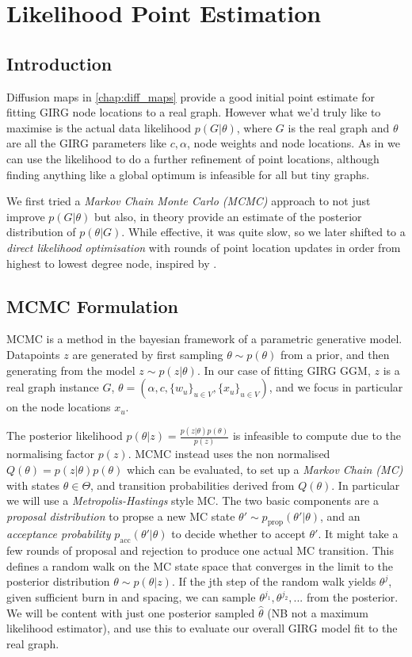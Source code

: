 \chapter{Likelihood Point Estimation}
\label{chap:likelihood_point_estimation}
\minitoc
\section{Introduction}
Diffusion maps in \cref{chap:diff_maps} provide a good initial point estimate for fitting GIRG node locations to a real graph. However what we'd truly like to maximise is the actual data likelihood $p(G | \theta)$, where $G$ is the real graph and $\theta$ are all the GIRG parameters like $c, \alpha$, node weights and node locations. As in \cite{garcia2019mercator} we can use the likelihood to do a further refinement of point locations, although finding anything like a global optimum is infeasible for all but tiny graphs.

We first tried a \textit{Markov Chain Monte Carlo (MCMC)} approach to not just improve $p(G | \theta)$ but also, in theory provide an estimate of the posterior distribution of $p(\theta | G)$. While effective, it was quite slow, so we later shifted to a \textit{direct likelihood optimisation} with rounds of point location updates in order from highest to lowest degree node, inspired by \cite{garcia2019mercator}.

\section{MCMC Formulation}
MCMC is a method in the bayesian framework of a parametric generative model. Datapoints $z$ are generated by first sampling $\theta \sim p(\theta)$ from a prior, and then generating from the model $z \sim p(z | \theta)$. In our case of fitting GIRG GGM, $z$ is a real graph instance $G$, $\theta = (\alpha, c, \{w_u\}_{u \in V}, \{x_u\}_{u \in V})$, and we focus in particular on the node locations $x_u$.

The posterior likelihood $p(\theta | z) = \frac{p(z | \theta) p(\theta)}{p(z)}$ is infeasible to compute due to the normalising factor $p(z)$. MCMC instead uses the non normalised $Q(\theta) = p(z | \theta) p(\theta)$ which can be evaluated, to set up a \textit{Markov Chain (MC)} with states $\theta \in \Theta$, and transition probabilities derived from $Q(\theta)$.
In particular we will use a \textit{Metropolis-Hastings} style MC. The two basic components are a \textit{proposal distribution} to propse a new MC state $\theta' \sim p_{\mathrm{prop}}(\theta' | \theta)$, and an \textit{acceptance probability} $p_{\mathrm{acc}}(\theta' | \theta)$ to decide whether to accept $\theta'$. It might take a few rounds of proposal and rejection to produce one actual MC transition. This defines  a random walk on the MC state space that converges in the limit to the posterior distribution $\theta \sim p(\theta | z)$. If the jth step of the random walk yields $\theta^j$, given sufficient burn in and spacing, we can sample $\theta^{j_1}, \theta^{j_2}, ...$ from the posterior. We will be content with just one posterior sampled $\hat{\theta}$ (NB not a maximum likelihood estimator), and use this to evaluate our overall GIRG model fit to the real graph.

